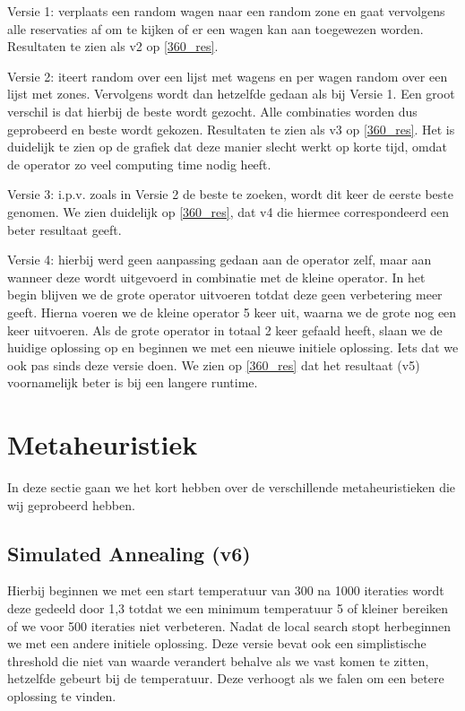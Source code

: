 \documentclass[a4paper, 12pt, one column]{article}
\begin{document}
Versie 1: verplaats een random wagen naar een random zone en gaat vervolgens alle reservaties af om te kijken of er een wagen kan aan toegewezen worden. Resultaten te zien als v2 op \ref{360_res}.

Versie 2: iteert random over een lijst met wagens en per wagen random over een lijst met zones. Vervolgens wordt dan hetzelfde gedaan als bij Versie 1. Een groot verschil is dat hierbij de beste wordt gezocht. Alle combinaties worden dus geprobeerd en beste wordt gekozen. Resultaten te zien als v3 op \ref{360_res}. Het is duidelijk te zien op de grafiek dat deze manier slecht werkt op korte tijd, omdat de operator zo veel computing time nodig heeft.

Versie 3: i.p.v. zoals in Versie 2 de beste te zoeken, wordt dit keer de eerste beste genomen. We zien duidelijk op \ref{360_res}, dat v4 die hiermee correspondeerd een beter resultaat geeft.

Versie 4: hierbij werd geen aanpassing gedaan aan de operator zelf, maar aan wanneer deze wordt uitgevoerd in combinatie met de kleine operator. In het begin blijven we de grote operator uitvoeren totdat deze geen verbetering meer geeft. Hierna voeren we de kleine operator 5 keer uit, waarna we de grote nog een keer uitvoeren. Als de grote operator in totaal 2 keer gefaald heeft, slaan we de huidige oplossing op en beginnen we met een nieuwe initiele oplossing. Iets dat we ook pas sinds deze versie doen. We zien op \ref{360_res} dat het resultaat (v5) voornamelijk beter is bij een langere runtime.

\section{Metaheuristiek}
In deze sectie gaan we het kort hebben over de verschillende metaheuristieken die wij geprobeerd hebben.
\subsection{Simulated Annealing (v6)}

Hierbij beginnen we met een start temperatuur van 300 na 1000 iteraties wordt deze gedeeld door 1,3 totdat we een minimum temperatuur 5 of kleiner bereiken of we voor 500 iteraties niet verbeteren.
Nadat de local search stopt herbeginnen we met een andere initiele oplossing. Deze versie bevat ook een simplistische threshold die niet van waarde verandert behalve als we vast komen te zitten,
hetzelfde gebeurt bij de temperatuur. Deze verhoogt als we falen om een betere oplossing te vinden.
\end{document}
